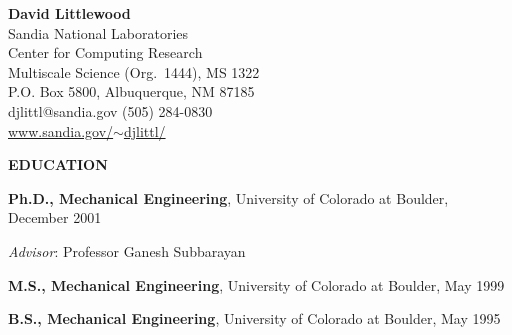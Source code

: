 \documentclass[11pt]{article}
\newlength{\itemskip} \setlength{\itemskip}{0.0in}
\newlength{\sectionskip} \setlength{\sectionskip}{0.2in}
\newlength{\listskip} \setlength{\listskip}{0.05in}
\newlength{\minipagewidth} \setlength{\minipagewidth}{6.25in} %
\begin{document}
\thispagestyle{empty}

\begin{center}
{\LARGE \textbf{David Littlewood}} \\
\vspace{0.1in}
%
Sandia National Laboratories \\
Center for Computing Research \\
Multiscale Science (Org.~1444), MS 1322 \\
P.O. Box 5800, Albuquerque, NM 87185 \\
djlittl@sandia.gov \hspace{.1in} (505) 284-0830 \\
\href{http://www.sandia.gov/~djlittl/}{www.sandia.gov/$\sim$djlittl/} \\
%
\end{center}

\noindent
{\large \textbf{EDUCATION}}
\vspace{\sectionskip}

\begin{minipage}{\minipagewidth}
\textbf{Ph.D., Mechanical Engineering}, University of Colorado at Boulder, December 2001 %

\vspace{\listskip}
{\it Advisor}: Professor Ganesh Subbarayan
\end{minipage}\vspace{\parskip}

\begin{minipage}{\minipagewidth}
\textbf{M.S., Mechanical Engineering}, University of Colorado at Boulder, May 1999 %
\end{minipage}\vspace{\itemskip}

\begin{minipage}{\minipagewidth}
\textbf{B.S., Mechanical Engineering}, University of Colorado at Boulder, May 1995 %
\end{minipage}
\end{document}
